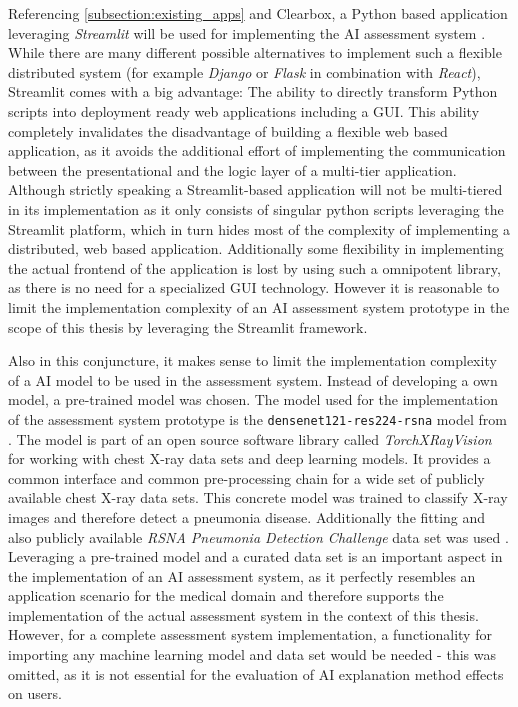 \documentclass[11pt,a4paper,english]{scrreprt}
\begin{document}
Referencing \autoref{subsection:existing_apps} and Clearbox, a Python based application leveraging \textit{Streamlit} will be used for implementing the AI assessment system \parencite{streamlit_website}. While there are many different possible alternatives to implement such a flexible distributed system (for example \textit{Django} or \textit{Flask} in combination with \textit{React}), Streamlit comes with a big advantage: The ability to directly transform Python scripts into deployment ready web applications including a GUI. This ability completely invalidates the disadvantage of building a flexible web based application, as it avoids the additional effort of implementing the communication between the presentational and the logic layer of a multi-tier application. Although strictly speaking a Streamlit-based application will not be multi-tiered in its implementation as it only consists of singular python scripts leveraging the Streamlit platform, which in turn hides most of the complexity of implementing a distributed, web based application. Additionally some flexibility in implementing the actual frontend of the application is lost by using such a omnipotent library, as there is no need for a specialized GUI technology. However it is reasonable to limit the implementation complexity of an AI assessment system prototype in the scope of this thesis by leveraging the Streamlit framework.

Also in this conjuncture, it makes sense to limit the implementation complexity of a AI model to be used in the assessment system. Instead of developing a own model, a pre-trained model was chosen. The model used for the implementation of the assessment system prototype is the \texttt{densenet121-res224-rsna} model from \textcite{cohen_torchxrayvision_2021}. The model is part of an open source software library called \textit{TorchXRayVision} for working with chest X-ray data sets and deep learning models. It provides a common interface and common pre-processing chain for a wide set of publicly available chest X-ray data sets. This concrete model was trained to classify X-ray images and therefore detect a pneumonia disease. Additionally the fitting and also publicly available \textit{RSNA Pneumonia Detection Challenge} data set was used \parencite{rsna_kaggle_website}. Leveraging a pre-trained model and a curated data set is an important aspect in the implementation of an AI assessment system, as it perfectly resembles an application scenario for the medical domain and therefore supports the implementation of the actual assessment system in the context of this thesis. However, for a complete assessment system implementation, a functionality for importing any machine learning model and data set would be needed - this was omitted, as it is not essential for the evaluation of AI explanation method effects on users.
\end{document}
